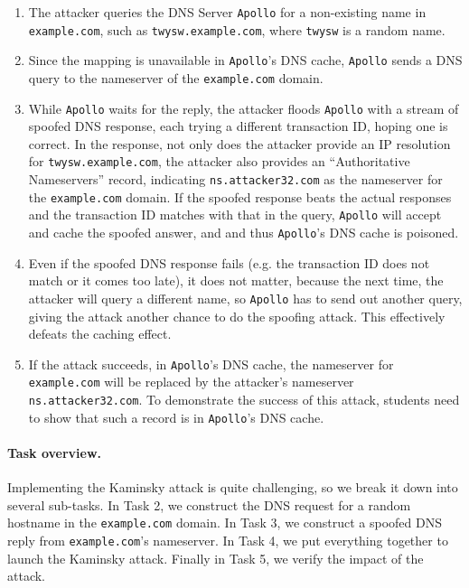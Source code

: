 \begin{enumerate}
\item The attacker queries the DNS Server {\tt Apollo} for a non-existing name in 
{\tt example.com}, such as {\tt twysw.example.com},
where {\tt twysw} is a random name. 

\item Since the mapping is unavailable in {\tt Apollo}'s DNS cache, 
{\tt Apollo} sends a DNS query to the nameserver of
the {\tt example.com} domain.

\item While {\tt Apollo} waits for the reply, 
the attacker floods {\tt Apollo} with a stream of spoofed DNS response,
each trying a different transaction ID, hoping one is correct.
In the response, not only does the attacker provide an IP resolution
for {\tt twysw.example.com}, the attacker 
also provides an ``Authoritative Nameservers'' record, indicating 
{\tt ns.attacker32.com} as the nameserver for the {\tt example.com} domain.
If the spoofed response beats the actual responses and
the transaction ID matches with that in the query, 
{\tt Apollo} will accept and cache the spoofed answer, and
and thus {\tt Apollo}'s DNS cache is poisoned.  

\item Even if the spoofed DNS response fails (e.g.
the transaction ID does not match or it comes too late),
it does not matter, because the next time, the attacker will query
a different name, so {\tt Apollo} has to send out another query, 
giving the attack another chance to do the spoofing attack. 
This effectively defeats the caching effect.


\item If the attack succeeds, in {\tt Apollo}'s DNS cache, the
nameserver for {\tt example.com} will be replaced by the attacker's
nameserver {\tt ns.attacker32.com}.
To demonstrate the success of this attack, students need to show that such a record 
is in {\tt Apollo}'s DNS cache. 

\end{enumerate}


\paragraph{Task overview.} Implementing the Kaminsky attack is quite challenging, 
so we break it down into several sub-tasks. 
In Task 2, we construct the DNS request for a random hostname 
in the \texttt{example.com} domain. In Task 3, we construct a spoofed 
DNS reply from \texttt{example.com}'s nameserver.
In Task 4, we put everything together to launch the 
Kaminsky attack. Finally in Task 5, we verify the impact of the attack. 


